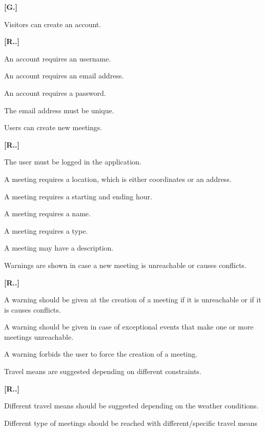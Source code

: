 \begin{list}
{\bfseries{}[G.]~}
{
}
\item Visitors can create an account.
\begin{list}
	{\bfseries{}[R..]~}
	{
	}
\item An account requires an username.
\item An account requires an email address.
\item An account requires a password.
\item The email address must be unique.
\end{list}
\item Users can create new meetings.
\begin{list}
	{\bfseries{}[R..]~}
	{
	}
	\item The user must be logged in the application.
\item A meeting requires a location, which is either coordinates or an address.
\item A meeting requires a starting and ending hour.
\item A meeting requires a name.
\item A meeting requires a type.
\item A meeting may have a description.
\end{list}
\item Warnings are shown in case a new meeting is unreachable or causes conflicts.
\begin{list}
	{\bfseries{}[R..]~}
	{
	}
\item A warning should be given at the creation of a meeting if it is unreachable or if it is causes conflicts.
\item A warning should be given in case of exceptional events that make one or more meetings unreachable.
\item A warning forbids the user to force the creation of a meeting.
\end{list}
\item Travel means are suggested depending on different constraints.
\begin{list}
	{\bfseries{}[R..]~}
	{
	}
\item Different travel means should be suggested depending on the weather conditions.
\item Different type of meetings should be reached with different/specific travel means

\end{list}
\end{list}
